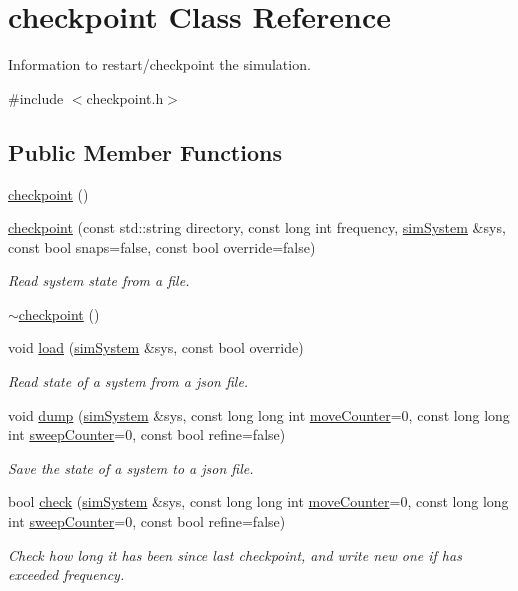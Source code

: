 \hypertarget{classcheckpoint}{\section{checkpoint Class Reference}
\label{classcheckpoint}
}


Information to restart/checkpoint the simulation.  




{\ttfamily \#include $<$checkpoint.\-h$>$}

\subsection*{Public Member Functions}
\begin{DoxyCompactItemize}
\item 
\hyperlink{classcheckpoint_a0c9fbc3decbdd8a0eedd43e4bef55583}{checkpoint} ()
\item 
\hyperlink{classcheckpoint_ac04bc1b2caf79f6071842919d5743024}{checkpoint} (const std\-::string directory, const long int frequency, \hyperlink{classsim_system}{sim\-System} \&sys, const bool snaps=false, const bool override=false)
\begin{DoxyCompactList}\small\item\em Read system state from a file. \end{DoxyCompactList}\item 
\hyperlink{classcheckpoint_a953aa90982db63755a071332c296ea68}{$\sim$checkpoint} ()
\item 
void \hyperlink{classcheckpoint_afe0ae7b3a2b83b5e321f09e9cb70a374}{load} (\hyperlink{classsim_system}{sim\-System} \&sys, const bool override)
\begin{DoxyCompactList}\small\item\em Read state of a system from a json file. \end{DoxyCompactList}\item 
void \hyperlink{classcheckpoint_a77a601382b9ca02a63be7712aa7beb04}{dump} (\hyperlink{classsim_system}{sim\-System} \&sys, const long long int \hyperlink{classcheckpoint_a5ab49a355714da4874aba00eb03f701d}{move\-Counter}=0, const long long int \hyperlink{classcheckpoint_ad011ddbca1ea708321335b1b3ac67e07}{sweep\-Counter}=0, const bool refine=false)
\begin{DoxyCompactList}\small\item\em Save the state of a system to a json file. \end{DoxyCompactList}\item 
bool \hyperlink{classcheckpoint_a66cc1e90f61d47baafb9564c5c40ef9a}{check} (\hyperlink{classsim_system}{sim\-System} \&sys, const long long int \hyperlink{classcheckpoint_a5ab49a355714da4874aba00eb03f701d}{move\-Counter}=0, const long long int \hyperlink{classcheckpoint_ad011ddbca1ea708321335b1b3ac67e07}{sweep\-Counter}=0, const bool refine=false)
\begin{DoxyCompactList}\small\item\em Check how long it has been since last checkpoint, and write new one if has exceeded frequency. \end{DoxyCompactList}\end{DoxyCompactItemize}
